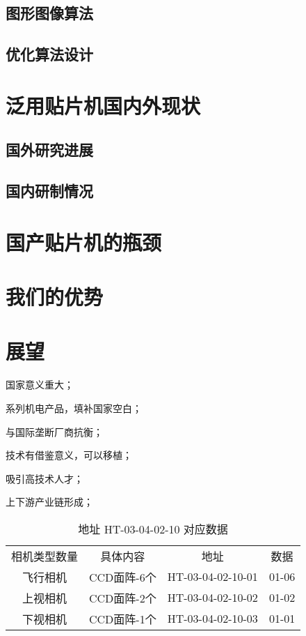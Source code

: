 \documentclass[a4paper]{article}%
\begin{document}
\begin{CJK}{UTF8}{gbsn}
\subsection{图形图像算法}
\subsection{优化算法设计}
\section{泛用贴片机国内外现状}
\subsection{国外研究进展}
\subsection{国内研制情况}
\section{国产贴片机的瓶颈}
\section{我们的优势}
\section{展望}
国家意义重大；

系列机电产品，填补国家空白；

与国际垄断厂商抗衡；

技术有借鉴意义，可以移植；

吸引高技术人才；

上下游产业链形成；

\begin{table}[h]
\caption{地址 HT-03-04-02-10 对应数据}\label{HT-03-04-02-10}
\centering
\begin{tabular}{|c|c|c|c|}
相机类型数量 & 具体内容       & 地址                  & 数据  \\
飞行相机   & CCD面阵-6个     & HT-03-04-02-10-01    & 01-06   \\
上视相机   & CCD面阵-2个     & HT-03-04-02-10-02    & 01-02   \\
下视相机   & CCD面阵-1个     & HT-03-04-02-10-03    & 01-01
\end{tabular}
\end{table}

\newpage%


\end{CJK}
\end{document}

